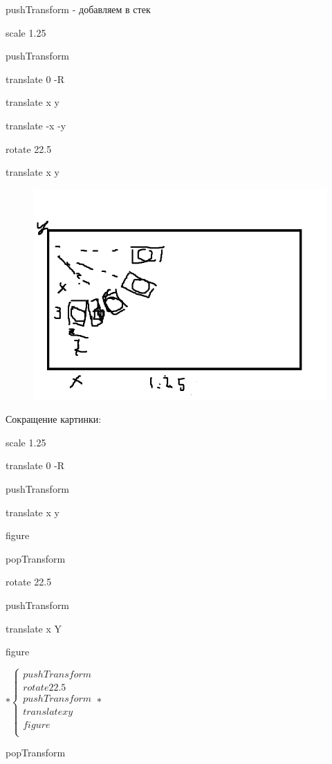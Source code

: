 \documentclass{article}
\begin{document}
pushTransform - добавляем в стек

\vspace{1cm}

scale 1.25

pushTransform

translate 0 -R

translate x y



translate -x -y

rotate 22.5

translate x y
\begin{figure} [H]
    \includegraphics[width=0.50\linewidth]{3.png}
\end{figure}




Сокращение картинки:

scale 1.25

translate 0 -R

pushTransform

translate x y

figure

popTransform

rotate 22.5

pushTransform

translate x Y

figure


$*\begin{cases}
    
pushTransform \\

rotate 22.5 \\

pushTransform \\

translate x y \\

figure \\

\end{cases}*$

popTransform
\end{document}
